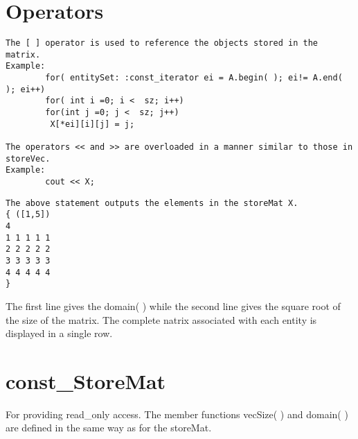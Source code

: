 \documentclass[letterpaper,12pt]{article}
\begin{document}
\section*{Operators}
\begin{verbatim}
The [ ] operator is used to reference the objects stored in the matrix. 
Example: 
        for( entitySet: :const_iterator ei = A.begin( ); ei!= A.end( ); ei++)
        for( int i =0; i <  sz; i++)
        for(int j =0; j <  sz; j++)
         X[*ei][i][j] = j;

The operators << and >> are overloaded in a manner similar to those in storeVec.
Example:
        cout << X;
\end{verbatim}
\pagebreak[4]
\begin{verbatim}
The above statement outputs the elements in the storeMat X. 
{ ([1,5])  
4
1 1 1 1 1
2 2 2 2 2 
3 3 3 3 3 
4 4 4 4 4 
}
\end{verbatim}
 The first line gives the domain( ) while the second line gives the square root 
of the size of the matrix. The complete natrix associated with each entity is 
displayed in a single row.

\section{const\_StoreMat}

For providing read\_only access. The member functions vecSize( ) and domain( ) 
are defined in the same way as for the storeMat. 
\end{document}
